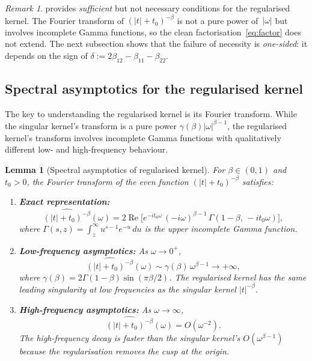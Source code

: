 \documentclass[12pt]{article}
\newtheorem{lemma}[theorem]{Lemma}
\theoremstyle{definition}
\theoremstyle{remark}
\newtheorem{remark}[theorem]{Remark}
\begin{document}
\begin{remark}\label{rem:suff_only}
 provides \emph{sufficient} but not necessary conditions for the
regularised kernel.  The Fourier transform of $(|t|+t_0)^{-\beta}$ is not a pure
power of~$|\omega|$ but involves incomplete Gamma functions, so the clean
factorisation~\eqref{eq:factor} does not extend.  The next subsection shows that
the failure of necessity is \emph{one-sided}: it depends on the sign of
$\delta := 2\beta_{12}-\beta_{11}-\beta_{22}$.
\end{remark}

\subsection{Spectral asymptotics for the regularised kernel}\label{sec:reg_spectral}

The key to understanding the regularised kernel is its Fourier transform.
While the singular kernel's transform is a pure power $\gamma(\beta)|\omega|^{\beta-1}$,
the regularised kernel's transform involves incomplete Gamma functions with
qualitatively different low- and high-frequency behaviour.

\begin{lemma}[Spectral asymptotics of regularised kernel]\label{lem:reg_FT}
For $\beta\in(0,1)$ and $t_0>0$, the Fourier transform of the even function
$(|t|+t_0)^{-\beta}$ satisfies:
\begin{enumerate}[label=\textup{(\roman*)},nosep]
\item \textbf{Exact representation:}
\begin{equation}\label{eq:reg_FT}
  \widehat{(|t|+t_0)^{-\beta}}(\omega)
  = 2\operatorname{Re}\bigl[e^{-it_0\omega}\,
    (-i\omega)^{\beta-1}\,\Gamma(1-\beta,\,-it_0\omega)\bigr],
\end{equation}
where $\Gamma(s,z)=\int_z^\infty u^{s-1}e^{-u}\,du$ is the upper incomplete
Gamma function.
\item \textbf{Low-frequency asymptotics:} As $\omega\to 0^+$,
\begin{equation}\label{eq:reg_low}
  \widehat{(|t|+t_0)^{-\beta}}(\omega)
  \sim \gamma(\beta)\,\omega^{\beta-1} \to +\infty,
\end{equation}
where $\gamma(\beta) = 2\Gamma(1-\beta)\sin(\pi\beta/2)$. The regularised
kernel has the same leading singularity at low frequencies as the singular
kernel $|t|^{-\beta}$.
\item \textbf{High-frequency asymptotics:} As $\omega\to\infty$,
\begin{equation}\label{eq:reg_high}
  \widehat{(|t|+t_0)^{-\beta}}(\omega) = O(\omega^{-2}).
\end{equation}
The high-frequency decay is faster than the singular kernel's
$O(\omega^{\beta-1})$ because the regularisation removes the
cusp at the origin.
\end{enumerate}
\end{lemma}
\end{document}
